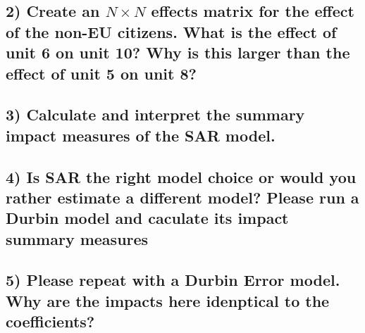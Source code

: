 \documentclass[
  letterpaper,
  DIV=11,
  numbers=noendperiod]{scrreprt}
\begin{document}
\hypertarget{create-an-n-times-n-effects-matrix-for-the-effect-of-the-non-eu-citizens.-what-is-the-effect-of-unit-6-on-unit-10-why-is-this-larger-than-the-effect-of-unit-5-on-unit-8}{%
\subsection*{\texorpdfstring{2) Create an \(N \times N\) effects matrix
for the effect of the non-EU citizens. What is the effect of unit 6 on
unit 10? Why is this larger than the effect of unit 5 on unit
8?}{2) Create an N \textbackslash times N effects matrix for the effect of the non-EU citizens. What is the effect of unit 6 on unit 10? Why is this larger than the effect of unit 5 on unit 8?}}\label{create-an-n-times-n-effects-matrix-for-the-effect-of-the-non-eu-citizens.-what-is-the-effect-of-unit-6-on-unit-10-why-is-this-larger-than-the-effect-of-unit-5-on-unit-8}}

\hypertarget{calculate-and-interpret-the-summary-impact-measures-of-the-sar-model.}{%
\subsection*{3) Calculate and interpret the summary impact measures of
the SAR
model.}\label{calculate-and-interpret-the-summary-impact-measures-of-the-sar-model.}}

\hypertarget{is-sar-the-right-model-choice-or-would-you-rather-estimate-a-different-model-please-run-a-durbin-model-and-caculate-its-impact-summary-measures}{%
\subsection*{4) Is SAR the right model choice or would you rather
estimate a different model? Please run a Durbin model and caculate its
impact summary
measures}\label{is-sar-the-right-model-choice-or-would-you-rather-estimate-a-different-model-please-run-a-durbin-model-and-caculate-its-impact-summary-measures}}

\hypertarget{please-repeat-with-a-durbin-error-model.-why-are-the-impacts-here-idenptical-to-the-coefficients}{%
\subsection*{5) Please repeat with a Durbin Error model. Why are the
impacts here idenptical to the
coefficients?}\label{please-repeat-with-a-durbin-error-model.-why-are-the-impacts-here-idenptical-to-the-coefficients}}
\end{document}
